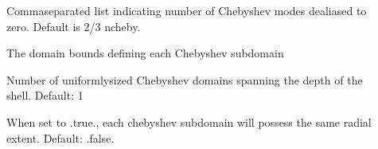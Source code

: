 \documentclass[letterpaper,11pt,english]{sphinxmanual}
\begin{document}
\begin{description}
\item[{}] \leavevmode
\sphinxAtStartPar
Comma\sphinxhyphen{}separated list indicating number of Chebyshev modes dealiased to zero.  Default is 2/3 ncheby.

\item[{}] \leavevmode
\sphinxAtStartPar
The domain bounds defining each Chebyshev subdomain

\item[{}] \leavevmode
\sphinxAtStartPar
Number of uniformly\sphinxhyphen{}sized Chebyshev domains spanning the depth of the shell.  Default: 1

\item[{}] \leavevmode
\sphinxAtStartPar
When set to .true., each chebyshev subdomain will possess the same radial extent.  Default:  .false.

\end{description}
\end{document}
